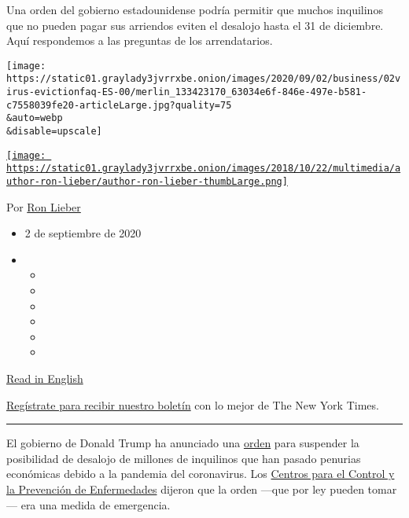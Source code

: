 Una orden del gobierno estadounidense podría permitir que muchos
inquilinos que no pueden pagar sus arriendos eviten el desalojo hasta el
31 de diciembre. Aquí respondemos a las preguntas de los arrendatarios.

\texttt{[image: https://static01.graylady3jvrrxbe.onion/images/2020/09/02/business/02virus-evictionfaq-ES-00/merlin\_133423170\_63034e6f-846e-497e-b581-c7558039fe20-articleLarge.jpg?quality=75\\\&auto=webp\\\&disable=upscale]}

\href{https://www.nytimes3xbfgragh.onion/by/ron-lieber}{\texttt{[image: https://static01.graylady3jvrrxbe.onion/images/2018/10/22/multimedia/author-ron-lieber/author-ron-lieber-thumbLarge.png]}}

Por \href{https://www.nytimes3xbfgragh.onion/by/ron-lieber}{Ron Lieber}

\begin{itemize}
\item
  2 de septiembre de 2020
\item
  \begin{itemize}
  \item
  \item
  \item
  \item
  \item
  \item
  \end{itemize}
\end{itemize}

\href{https://www.nytimes3xbfgragh.onion/2020/09/02/your-money/eviction-moratorium-covid.html}{Read
in English}

\href{https://www.nytimes3xbfgragh.onion/newsletters/el-times}{Regístrate
para recibir nuestro boletín} con lo mejor de The New York Times.

\begin{center}\rule{0.5\linewidth}{\linethickness}\end{center}

El gobierno de Donald Trump ha anunciado una
\href{https://s3.amazonaws.com/public-inspection.federalregister.gov/2020-19654.pdf}{orden}
para suspender la posibilidad de desalojo de millones de inquilinos que
han pasado penurias económicas debido a la pandemia del coronavirus. Los
\href{https://www.nytimes3xbfgragh.onion/2020/09/01/business/eviction-moratorium-order.html}{Centros
para el Control y la Prevención de Enfermedades} dijeron que la orden
---que por ley pueden tomar--- era una medida de emergencia.

